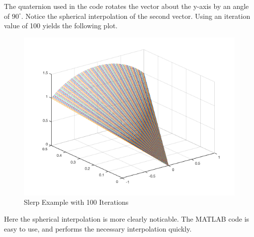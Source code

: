 The quaternion used in the code rotates the vector about the y-axis by an angle of $90^\circ$.
Notice the spherical interpolation of the second vector.
Using an iteration value of 100 yields the following plot.


\begin{figure}[H]
\centering
\includegraphics[width = .75\textwidth]{Figures/slerp100.png}
\caption{Slerp Example with 100 Iterations}
\label{fig:slerp100}
\end{figure}

Here the spherical interpolation is more clearly noticable.
The MATLAB code is easy to use, and performs the necessary interpolation quickly.
